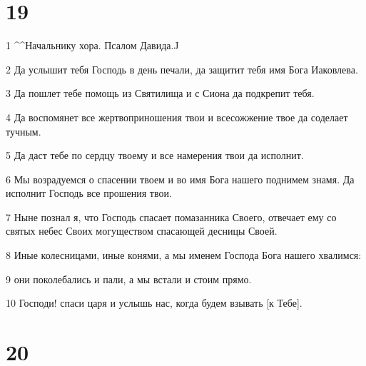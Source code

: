 \chapter{19}

\par 1 ^^Начальнику хора. Псалом Давида.^^
\par 2 Да услышит тебя Господь в день печали, да защитит тебя имя Бога Иаковлева.
\par 3 Да пошлет тебе помощь из Святилища и с Сиона да подкрепит тебя.
\par 4 Да воспомянет все жертвоприношения твои и всесожжение твое да соделает тучным.
\par 5 Да даст тебе по сердцу твоему и все намерения твои да исполнит.
\par 6 Мы возрадуемся о спасении твоем и во имя Бога нашего поднимем знамя. Да исполнит Господь все прошения твои.
\par 7 Ныне познал я, что Господь спасает помазанника Своего, отвечает ему со святых небес Своих могуществом спасающей десницы Своей.
\par 8 Иные колесницами, иные конями, а мы именем Господа Бога нашего хвалимся:
\par 9 они поколебались и пали, а мы встали и стоим прямо.
\par 10 Господи! спаси царя и услышь нас, когда будем взывать [к Тебе].

\chapter{20}

